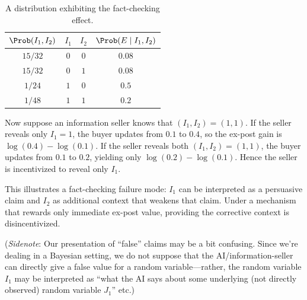 \begin{example}
  \begin{table}[h]
  \centering
  \caption{A distribution exhibiting the fact-checking effect.}
  \label{tab:factcheck-example}
  \begin{tabular}{cccc}
  \toprule
  $\Prob(I_1,I_2)$ & $I_1$ & $I_2$ & $\Prob(E\mid I_1,I_2)$ \\
  \midrule
  $15/32$ & $0$ & $0$ & $0.08$ \\
  $15/32$ & $0$ & $1$ & $0.08$ \\
  $1/24$  & $1$ & $0$ & $0.5$ \\
  $1/48$  & $1$ & $1$ & $0.2$ \\
  \bottomrule
  \end{tabular}
  \end{table}

  Now suppose an information seller knows that $(I_1,I_2)=(1,1)$. If the seller reveals only $I_1=1$, the buyer updates from $0.1$ to $0.4$, so the ex-post gain is $\log(0.4)-\log(0.1)$. If the seller reveals both $(I_1,I_2)=(1,1)$, the buyer updates from $0.1$ to $0.2$, yielding only $\log(0.2)-\log(0.1)$. Hence the seller is incentivized to reveal only $I_1$.

  This illustrates a fact-checking failure mode: $I_1$ can be interpreted as a persuasive claim and $I_2$ as additional context that weakens that claim. Under a mechanism that rewards only immediate ex-post value, providing the corrective context is disincentivized.


  (\emph{Sidenote}: Our presentation of ``false'' claims may be a bit confusing. Since we're dealing in a Bayesian setting, we do not suppose that the AI/information-seller can directly give a false value for a random variable---rather, the random variable $I_1$ may be interpreted as ``what the AI says about some underlying (not directly observed) random variable $J_1$'' etc.)
\end{example}






